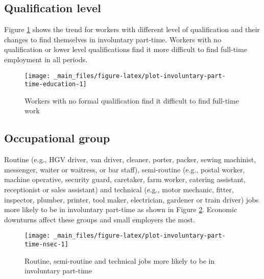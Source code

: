 \documentclass[
]{book}
\begin{document}
\hypertarget{qualification-level}{%
\subsection{Qualification level}\label{qualification-level}}

Figure \ref{fig:plot-involuntary-part-time-education} shows the trend for workers with different level of qualification and their changes to find themselves in involuntary part-time. Workers with no qualification or lower level qualifications find it more difficult to find full-time employment in all periods.

\begin{figure}

{\centering \texttt{[image: \_main\_files/figure-latex/plot-involuntary-part-time-education-1]} 

}

\caption{Workers with no formal qualification find it difficult to find full-time work}\label{fig:plot-involuntary-part-time-education}
\end{figure}

\hypertarget{occupational-group}{%
\subsection{Occupational group}\label{occupational-group}}

Routine (e.g., HGV driver, van driver, cleaner, porter, packer, sewing machinist, messenger, waiter or waitress, or bar staff), semi-routine (e.g., postal worker, machine operative, security guard, caretaker, farm worker, catering assistant, receptionist or sales assistant) and technical (e.g., motor mechanic, fitter, inspector, plumber, printer, tool maker, electrician, gardener or train driver) jobs more likely to be in involuntary part-time as shown in Figure \ref{fig:plot-involuntary-part-time-nsec}. Economic downturns affect these groups and small employers the most.

\begin{figure}

{\centering \texttt{[image: \_main\_files/figure-latex/plot-involuntary-part-time-nsec-1]} 

}

\caption{Routine, semi-routine and technical jobs more likely to be in involuntary part-time }\label{fig:plot-involuntary-part-time-nsec}
\end{figure}
\end{document}
